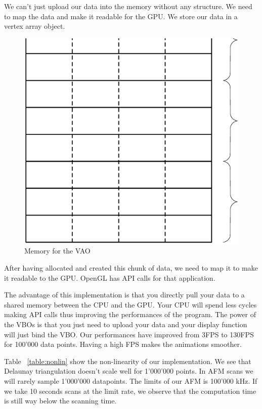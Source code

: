 We can't just upload our data into the memory without any structure. We need to map the data and make it readable for the GPU. We store our data in a vertex array object.

\begin{figure}[H]
  \centering
  \includegraphics[scale=0.2]{images/memory.eps}
    \caption{Memory for the VAO}
  \label{memoryVAO}
\end{figure}


After having allocated and created this chunk of data, we need to map it to make it readable to the GPU. OpenGL has API calls for that application.

The advantage of this implementation is that you directly pull your data to a shared memory between the CPU and the GPU. Your CPU will spend less cycles making API calls thus improving the performances of the program. The power of the VBOs is that you just need to upload your data and your display function will just bind the VBO. Our performances have improved from 3FPS to 130FPS for 100'000 data points. Having a high FPS makes the animations smoother.

Table  ~\ref{table:nonlin} show the non-linearity of our implementation. We see that Delaunay triangulation doesn't scale well for 1'000'000 points. In AFM scans we will rarely sample 1'000'000 datapoints. The limits of our AFM is 100'000 kHz. If we take 10 seconds scans at the limit rate, we observe that the computation time is still way below the scanning time. 

